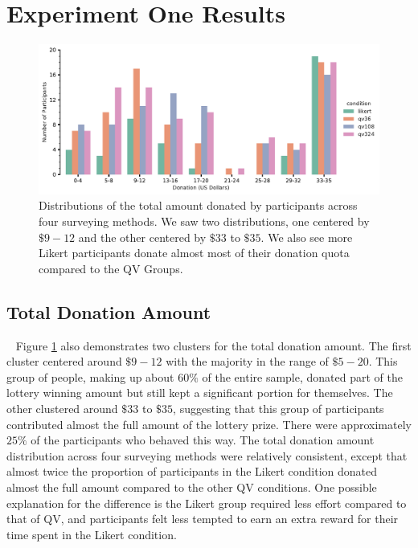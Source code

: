 \section{Experiment One Results}
\begin{figure}[htpb]
    \centering
    \includegraphics[width=\textwidth, keepaspectratio=true]{content/image/total_contributions_across_conditions.pdf}
    \caption{
       Distributions of the total amount donated by participants across four surveying methods.
       We saw two distributions, one centered by $\$9-12$ and the other centered by $\$33$ to $\$35$.
       We also see more Likert participants donate almost most of their donation quota compared to the QV Groups.
    }
    \label{fig:total_don_exp1}
\end{figure}

\subsection{Total Donation Amount}~\label{total_donation}
Figure \ref{fig:total_don_exp1} also demonstrates two clusters for the total donation amount. The first cluster centered around $\$9-12$ with the majority in the range of $\$5-20$. This group of people, making up about $60\%$ of the entire sample, donated part of the lottery winning amount but still kept a significant portion for themselves. The other clustered around $\$33$ to $\$35$, suggesting that this group of participants
contributed almost the full amount of the lottery prize. There were approximately $25\%$ of the participants who behaved this way. The total donation amount distribution across four surveying methods were relatively consistent, except that almost twice the proportion of participants in the Likert condition donated almost the full amount compared to the other QV conditions. One possible explanation for the difference is 
the Likert group required less effort compared to that of QV, and participants felt less tempted to earn an extra reward for their time spent in the Likert condition. 

